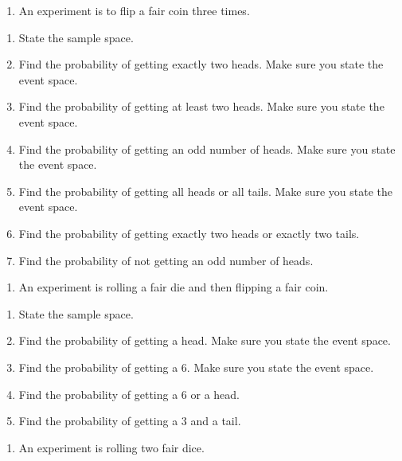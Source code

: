 \documentclass[
]{book}
\providecommand{\tightlist}{%
  \setlength{\itemsep}{0pt}\setlength{\parskip}{0pt}}
\begin{document}
\begin{enumerate}
\def\labelenumi{\arabic{enumi}.}
\setcounter{enumi}{2}
\tightlist
\item
  An experiment is to flip a fair coin three times.
\end{enumerate}

\begin{enumerate}
\def\labelenumi{\alph{enumi}.}
\tightlist
\item
  State the sample space.
\item
  Find the probability of getting exactly two heads. Make sure you state the event space.
\item
  Find the probability of getting at least two heads. Make sure you state the event space.
\item
  Find the probability of getting an odd number of heads. Make sure you state the event space.
\item
  Find the probability of getting all heads or all tails. Make sure you state the event space.
\item
  Find the probability of getting exactly two heads or exactly two tails.
\item
  Find the probability of not getting an odd number of heads.
\end{enumerate}

\begin{enumerate}
\def\labelenumi{\arabic{enumi}.}
\setcounter{enumi}{3}
\tightlist
\item
  An experiment is rolling a fair die and then flipping a fair coin.
\end{enumerate}

\begin{enumerate}
\def\labelenumi{\alph{enumi}.}
\tightlist
\item
  State the sample space.
\item
  Find the probability of getting a head. Make sure you state the event space.
\item
  Find the probability of getting a 6. Make sure you state the event space.
\item
  Find the probability of getting a 6 or a head.
\item
  Find the probability of getting a 3 and a tail.
\end{enumerate}

\begin{enumerate}
\def\labelenumi{\arabic{enumi}.}
\setcounter{enumi}{4}
\tightlist
\item
  An experiment is rolling two fair dice.
\end{enumerate}
\end{document}

